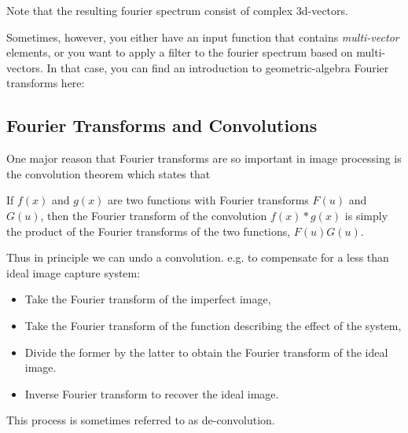 Note that the resulting fourier spectrum consist of complex 3d-vectors.

Sometimes, however, you either have an input function that contains \emph{multi-vector} elements,
or you want to apply a filter to the fourier spectrum based on multi-vectors.
In that case, you can find an introduction to geometric-algebra Fourier transforms here: 



\subsection{Fourier Transforms and Convolutions}
One major reason that Fourier transforms are so important in image processing is the convolution theorem which states that

If $f(x)$ and $g(x)$ are two functions with Fourier transforms $F(u)$ and $G(u)$,
then the Fourier transform of the convolution $f(x)*g(x)$ is simply the product of the Fourier transforms of the two functions, $F(u) G(u)$.

Thus in principle we can undo a convolution. e.g. to compensate for a less than ideal image capture system:

\begin{itemize}
	\item Take the Fourier transform of the imperfect image,
	\item Take the Fourier transform of the function describing the effect of the system,
	\item Divide the former by the latter to obtain the Fourier transform of the ideal image.
	\item Inverse Fourier transform to recover the ideal image.
\end{itemize}
This process is sometimes referred to as de-convolution.

